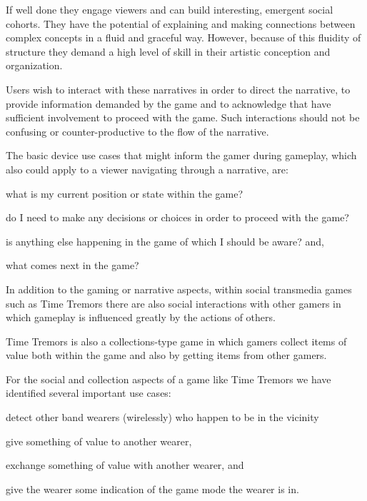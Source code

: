 \documentclass{chi-ext}
\begin{document}
If well done they engage viewers and can build interesting, emergent social cohorts. They have the potential of explaining and making connections between complex concepts in a fluid and graceful way. However, because of this fluidity of structure they demand a high level of skill in their artistic conception and organization. 

Users wish to interact with these narratives in order to direct the narrative, to provide information demanded by the game and to acknowledge that have sufficient involvement to proceed with the game. Such interactions should not be confusing or counter-productive to the flow of the narrative. 

The basic device use cases that might inform the gamer during gameplay, which also could apply to a viewer navigating through a narrative, are: 
\begin{inparaenum}
  \item what is my current position or state within the game?
  \item do I need to make any decisions or choices in order to proceed with the game?
  \item is anything else happening in the game of which I should be aware? and,
  \item what comes next in the game? 
\end{inparaenum}

In addition to the gaming or narrative aspects, within social transmedia games such as Time Tremors there are also social interactions with other gamers in which gameplay is influenced greatly by the actions of others. 

Time Tremors is also a collections-type game in which gamers collect items of value both within the game and also by getting items from other gamers. 

For the social and collection aspects of a game like Time Tremors we have identified several important use cases: 
\begin{inparaenum}
\item detect other band wearers (wirelessly) who happen to be in the vicinity
\item give something of value to another wearer, 
\item exchange something of value with another wearer, and
\item give the wearer some indication of the game mode the wearer is in.
\end{inparaenum}
\end{document}
